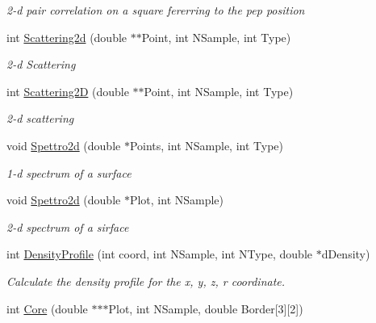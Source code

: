 \begin{DoxyCompactItemize}
\begin{DoxyCompactList}\small\item\em 2-\/d pair correlation on a square fererring to the pep position \end{DoxyCompactList}\item 
int \hyperlink{classVarData_a6499011573215b41c430029fddef1c97}{Scattering2d} (double $\ast$$\ast$Point, int N\+Sample, int Type)\hypertarget{classVarData_a6499011573215b41c430029fddef1c97}{}\label{classVarData_a6499011573215b41c430029fddef1c97}

\begin{DoxyCompactList}\small\item\em 2-\/d Scattering \end{DoxyCompactList}\item 
int \hyperlink{classVarData_a65f00067c992aa2edca4a59b750d1d10}{Scattering2D} (double $\ast$$\ast$Point, int N\+Sample, int Type)\hypertarget{classVarData_a65f00067c992aa2edca4a59b750d1d10}{}\label{classVarData_a65f00067c992aa2edca4a59b750d1d10}

\begin{DoxyCompactList}\small\item\em 2-\/d scattering \end{DoxyCompactList}\item 
void \hyperlink{classVarData_a2ad0f2350b0470eae15cfad3e6ce2343}{Spettro2d} (double $\ast$Points, int N\+Sample, int Type)\hypertarget{classVarData_a2ad0f2350b0470eae15cfad3e6ce2343}{}\label{classVarData_a2ad0f2350b0470eae15cfad3e6ce2343}

\begin{DoxyCompactList}\small\item\em 1-\/d spectrum of a surface \end{DoxyCompactList}\item 
void \hyperlink{classVarData_aad697561fff7291ab172d5e053e5c5fc}{Spettro2d} (double $\ast$Plot, int N\+Sample)\hypertarget{classVarData_aad697561fff7291ab172d5e053e5c5fc}{}\label{classVarData_aad697561fff7291ab172d5e053e5c5fc}

\begin{DoxyCompactList}\small\item\em 2-\/d spectrum of a sirface \end{DoxyCompactList}\item 
int \hyperlink{classVarData_ad24bc84bc8f9fc3e311a9efd82f53e27}{Density\+Profile} (int coord, int N\+Sample, int N\+Type, double $\ast$d\+Density)
\begin{DoxyCompactList}\small\item\em Calculate the density profile for the x, y, z, r coordinate. \end{DoxyCompactList}\item 
int \hyperlink{classVarData_a9b95694061cf3b61338ecb6db69954e9}{Core} (double $\ast$$\ast$$\ast$Plot, int N\+Sample, double Border\mbox{[}3\mbox{]}\mbox{[}2\mbox{]})\hypertarget{classVarData_a9b95694061cf3b61338ecb6db69954e9}{}\label{classVarData_a9b95694061cf3b61338ecb6db69954e9}


\end{DoxyCompactItemize}
